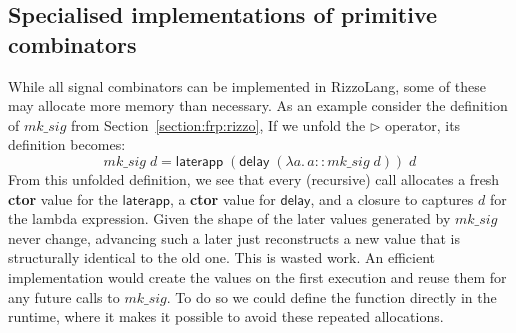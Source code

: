 \subsection{Specialised implementations of primitive combinators}

While all signal combinators can be implemented in RizzoLang, some of these may allocate more memory than necessary.
As an example consider the definition of $mk\_sig$ from Section~\ref{section:frp:rizzo}, 
If we unfold the $\triangleright$ operator, its definition becomes:
\[mk\_sig \; d = \mathsf{laterapp} \; (\mathsf{delay} \; (\lambda a. \, a :: mk\_sig \; d)) \; d\]
From this unfolded definition, we see that every (recursive) call allocates a fresh \textbf{ctor} value for the $\mathsf{laterapp}$, a \textbf{ctor} value for $\mathsf{delay}$, and a closure to captures $d$ for the lambda expression.
Given the shape of the later values generated by $mk\_sig$ never change, advancing such a later just reconstructs a new value that is structurally identical to the old one. This is wasted work.
An efficient implementation would create the values on the first execution and reuse them for any future calls to $mk\_sig$. To do so we could define the function directly in the runtime, where it makes it possible to avoid these repeated allocations.
